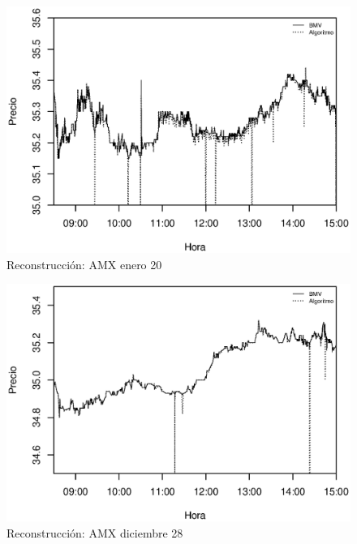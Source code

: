 \documentclass[11pt]{article}
\numberwithin{equation}{section} %
\begin{document}
\begin{figure}[htbp] \centering
\includegraphics[scale=0.75, trim=0 0.5cm 0 1.5cm]{amx012011.eps}
\caption{Reconstrucción: AMX enero 20}
\label{amx0120}
\end{figure}

\begin{figure}[htbp] \centering
\includegraphics[scale=0.75, trim=0 0.5cm 0 1.5cm]{amx122810.eps}
\caption{Reconstrucción: AMX diciembre 28}
\label{amx1228}
\end{figure}
\end{document}
